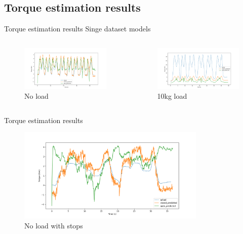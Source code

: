 \documentclass[aspectratio=169]{beamer}
\begin{document}
\subsection{Torque estimation results}
\begin{frame}{Torque estimation results}
Singe dataset models
\begin{columns}
\begin{column}{0.5\textwidth}
    \centering
	\begin{figure}[htbp]
	  \centering
	  \includegraphics[width=\textwidth]{open_vs_closed_0g.png}
	  \caption{No load}
	\end{figure}
    \end{column}
    \begin{column}{0.5\textwidth}
	\begin{figure}[htbp]
	  \centering
	  \includegraphics[width=\textwidth]{open_vs_closed_10kg.png}
	  \caption{10kg load}
	\end{figure}
    \end{column}
    \end{columns}
\end{frame}
\begin{frame}{Torque estimation results}
\begin{figure}[htbp]
  \centering
  \includegraphics[width=0.8\textwidth]{open_vs_closed_0g_stops.png}
  \caption{No load with stops}
\end{figure}
\end{frame}
\end{document}
